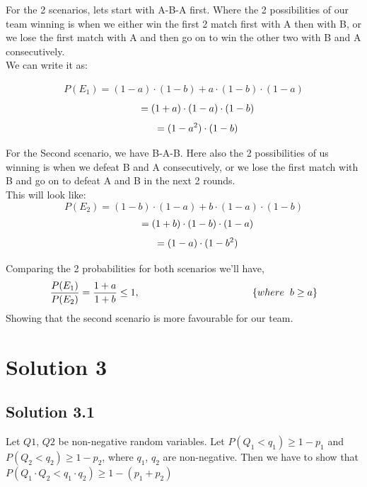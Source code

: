 \documentclass[fleqn]{article}
\begin{document}
For the 2 scenarios, lets start with A-B-A first. Where the 2 possibilities of our team winning is when we either win the first 2 match first with A then with B, or we lose the first match with A and then go on to win the other two with B and A consecutively.
\\We can write it as:

\begin{align*}
    P(E_1) = (1-a)\cdot(1-b) + a\cdot(1-b)\cdot(1-a)
\end{align*}
\begin{align*}
    \hspace{10 mm} = (1+a)\cdot(1-a)\cdot(1-b)
\end{align*}
\begin{equation}
    \hspace{10 mm}     = (1-a^2)\cdot(1-b)
\end{equation}

For the Second scenario, we have B-A-B. Here also the 2 possibilities of us winning is when we defeat B and A consecutively, or we lose the first match with B and go on to defeat A and B in the next 2 rounds.
\\This will look like:
\begin{displaymath}
    P(E_2) = (1-b)\cdot(1-a) + b\cdot(1-a)\cdot(1-b)
\end{displaymath}
\begin{align*}
    \hspace{10 mm}     = (1+b)\cdot(1-b)\cdot(1-a)
\end{align*}
\begin{equation}
    \hspace{10 mm} = (1-a)\cdot(1-b^2)
\end{equation}

Comparing the 2 probabilities for both scenarios we'll have,
\begin{align*}
    \frac{P(E_1)}{P(E_2)} = \frac{1+a}{1+b} \leq 1, \hspace{40 mm} \{where \hspace{2 mm}b \geq a\}
\end{align*}
Showing that the second scenario is more favourable for our team.

\newpage 
\section{Solution 3}
\subsection{Solution 3.1}
Let $Q1$, $Q2$ be non-negative random variables. Let $P(Q_1 < q_1) \geq 1 - p_1$ and $P(Q_2 < q_2) \geq 1 - p_2$,
where $q_1$, $q_2$ are non-negative. Then we have to show that $P(Q_1\cdot Q_2 < q_1\cdot q_2) \geq 1 - (p_1 + p_2)$
\end{document}
